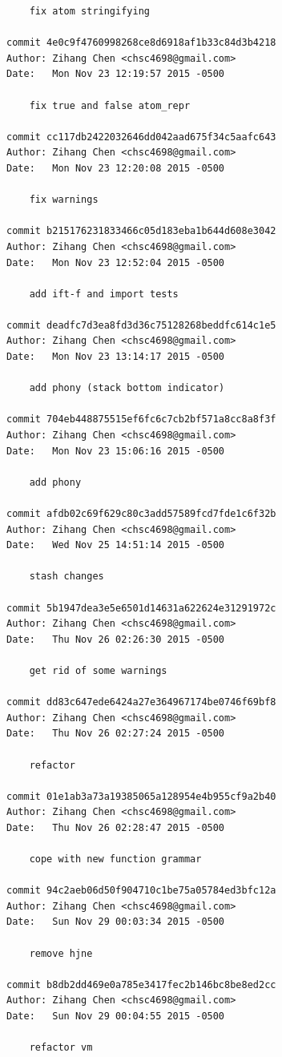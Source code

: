 \documentclass{report}
\begin{document}
\begin{appendices}
\begin{verbatim}
    fix atom stringifying

commit 4e0c9f4760998268ce8d6918af1b33c84d3b4218
Author: Zihang Chen <chsc4698@gmail.com>
Date:   Mon Nov 23 12:19:57 2015 -0500

    fix true and false atom_repr

commit cc117db2422032646dd042aad675f34c5aafc643
Author: Zihang Chen <chsc4698@gmail.com>
Date:   Mon Nov 23 12:20:08 2015 -0500

    fix warnings

commit b215176231833466c05d183eba1b644d608e3042
Author: Zihang Chen <chsc4698@gmail.com>
Date:   Mon Nov 23 12:52:04 2015 -0500

    add ift-f and import tests

commit deadfc7d3ea8fd3d36c75128268beddfc614c1e5
Author: Zihang Chen <chsc4698@gmail.com>
Date:   Mon Nov 23 13:14:17 2015 -0500

    add phony (stack bottom indicator)

commit 704eb448875515ef6fc6c7cb2bf571a8cc8a8f3f
Author: Zihang Chen <chsc4698@gmail.com>
Date:   Mon Nov 23 15:06:16 2015 -0500

    add phony

commit afdb02c69f629c80c3add57589fcd7fde1c6f32b
Author: Zihang Chen <chsc4698@gmail.com>
Date:   Wed Nov 25 14:51:14 2015 -0500

    stash changes

commit 5b1947dea3e5e6501d14631a622624e31291972c
Author: Zihang Chen <chsc4698@gmail.com>
Date:   Thu Nov 26 02:26:30 2015 -0500

    get rid of some warnings

commit dd83c647ede6424a27e364967174be0746f69bf8
Author: Zihang Chen <chsc4698@gmail.com>
Date:   Thu Nov 26 02:27:24 2015 -0500

    refactor

commit 01e1ab3a73a19385065a128954e4b955cf9a2b40
Author: Zihang Chen <chsc4698@gmail.com>
Date:   Thu Nov 26 02:28:47 2015 -0500

    cope with new function grammar

commit 94c2aeb06d50f904710c1be75a05784ed3bfc12a
Author: Zihang Chen <chsc4698@gmail.com>
Date:   Sun Nov 29 00:03:34 2015 -0500

    remove hjne

commit b8db2dd469e0a785e3417fec2b146bc8be8ed2cc
Author: Zihang Chen <chsc4698@gmail.com>
Date:   Sun Nov 29 00:04:55 2015 -0500

    refactor vm


\end{verbatim}
\end{appendices}
\end{document}
